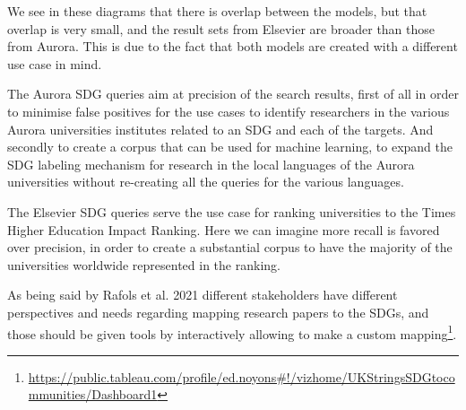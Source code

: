\documentclass{article}
\begin{document}
We see in these diagrams that there is overlap between the models, but that overlap is very small, and the result sets from Elsevier are broader than those from Aurora. This is due to the fact that both models are created with a different use case in mind.

The Aurora SDG queries aim at precision of the search results, first of all in order to minimise false positives for the use cases to identify researchers in the various Aurora universities institutes related to an SDG and each of the targets. And secondly to create a corpus that can be used for machine learning, to expand the SDG labeling mechanism for research in the local languages of the Aurora universities without re-creating all the queries for the various languages.

The Elsevier SDG queries serve the use case for ranking universities to the Times Higher Education Impact Ranking. Here we can imagine more recall is favored over precision, in order to create a substantial corpus to have the majority of the universities worldwide represented in the ranking.

As being said by Rafols et al. 2021 \cite{rafols_visualising_2021} different stakeholders have different perspectives and needs regarding mapping research papers to the SDGs, and those should be given tools by interactively allowing to make a custom mapping\footnote{\url{https://public.tableau.com/profile/ed.noyons\#!/vizhome/UKStringsSDGtocommunities/Dashboard1}}.

\end{document}

